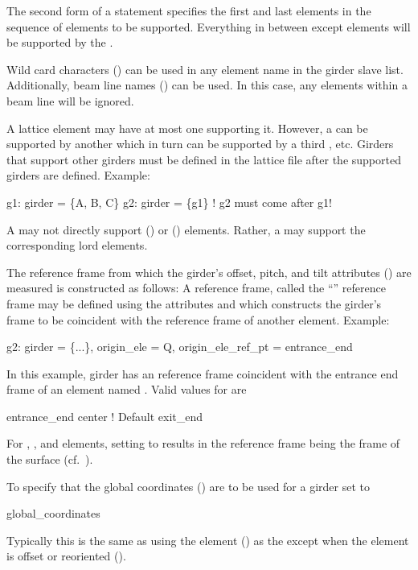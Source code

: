 The second form of a  statement specifies the first and last elements in the sequence of
elements to be supported. Everything in between except  elements will be supported by the
.

Wild card characters () can be used in any element name in the girder slave
list. Additionally, beam line names () can be used. In this case, any
 elements within a beam line will be ignored.

A lattice element may have at most one  supporting it. However, a  can be
supported by another  which in turn can be supported by a third , etc. Girders
that support other girders must be defined in the lattice file after the supported girders are
defined. Example:
\begin{example}
  g1: girder = \{A, B, C\}
  g2: girder = \{g1\}      ! g2 must come after g1!
\end{example}

A  may not directly support  () or 
() elements. Rather, a  may support the corresponding lord elements.

The reference frame from which the girder's offset, pitch, and tilt attributes () are
measured is constructed as follows: A reference frame, called the ``'' reference frame
may be defined using the attributes  and  which constructs the
girder's  frame to be coincident with the reference frame of another element. Example:
\begin{example}
  g2: girder = \{...\}, origin_ele = Q, origin_ele_ref_pt = entrance_end
\end{example}
In this example, girder  has an  reference frame coincident with the entrance end
frame of an element named . Valid values for  are
\begin{example}
  entrance_end
  center        ! Default
  exit_end
\end{example}
For , , and  elements, setting 
to  results in the reference frame being the frame of the surface (cf.~).

To specify that the global coordinates () are to be used for a girder set
 to
\begin{example}
  global_coordinates
\end{example}
Typically this is the same as using the 
element () as the  except when the  element is offset
or reoriented ().

